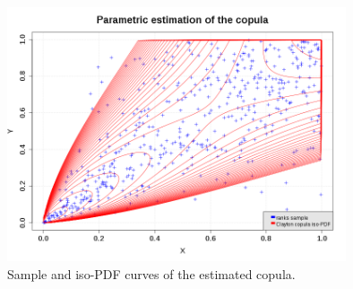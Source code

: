             \begin{figure}[H]
               \begin{center}
                 \includegraphics[width=10cm]{Figures/copula_estimation.png}
               \end{center}
               \caption{Sample and iso-PDF curves of the estimated copula.}
               \label{Superposition}
             \end{figure}
